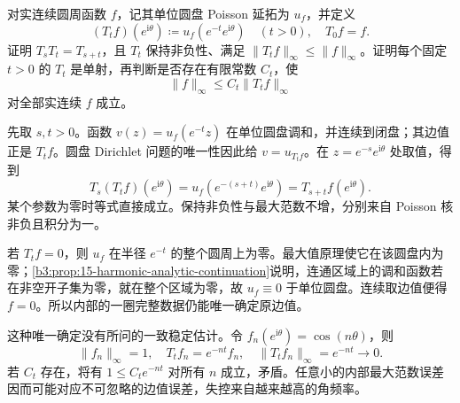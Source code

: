\begin{exercise}[重复向内延拓与边值恢复]\label{b3:ex:16-draft-01}
对实连续圆周函数 \(f\)，记其单位圆盘 Poisson 延拓为 \(u_f\)，并定义
\[
 (T_t f)(e^{\mathrm i\theta})\coloneqq
 u_f(e^{-t}e^{\mathrm i\theta})\quad(t>0),\quad T_0f=f.
\]
证明 \(T_sT_t=T_{s+t}\)，且 \(T_t\) 保持非负性、满足 \(\|T_tf\|_\infty\le\|f\|_\infty\)。证明每个固定 \(t>0\) 的 \(T_t\) 是单射，再判断是否存在有限常数 \(C_t\)，使
\[
 \|f\|_\infty\le C_t\|T_tf\|_\infty
\]
对全部实连续 \(f\) 成立。
\end{exercise}
\begin{solution}
先取 \(s,t>0\)。函数 \(v(z)=u_f(e^{-t}z)\) 在单位圆盘调和，并连续到闭盘；其边值正是 \(T_tf\)。圆盘 Dirichlet 问题的唯一性因此给 \(v=u_{T_tf}\)。在 \(z=e^{-s}e^{\mathrm i\theta}\) 处取值，得到
\[
 T_s(T_tf)(e^{\mathrm i\theta})
 =u_f(e^{-(s+t)}e^{\mathrm i\theta})
 =T_{s+t}f(e^{\mathrm i\theta}).
\]
某个参数为零时等式直接成立。保持非负性与最大范数不增，分别来自 Poisson 核非负且积分为一。

若 \(T_tf=0\)，则 \(u_f\) 在半径 \(e^{-t}\) 的整个圆周上为零。最大值原理使它在该圆盘内为零；\cref{b3:prop:15-harmonic-analytic-continuation}说明，连通区域上的调和函数若在非空开子集为零，就在整个区域为零，故 \(u_f\equiv0\) 于单位圆盘。连续取边值便得 \(f=0\)。所以内部的一圈完整数据仍能唯一确定原边值。

这种唯一确定没有所问的一致稳定估计。令 \(f_n(e^{\mathrm i\theta})=\cos(n\theta)\)，则
\[
 \|f_n\|_\infty=1,\quad
 T_tf_n=e^{-nt}f_n,\quad
 \|T_tf_n\|_\infty=e^{-nt}\longrightarrow0.
\]
若 \(C_t\) 存在，将有 \(1\le C_te^{-nt}\) 对所有 \(n\) 成立，矛盾。任意小的内部最大范数误差因而可能对应不可忽略的边值误差，失控来自越来越高的角频率。
\end{solution}

